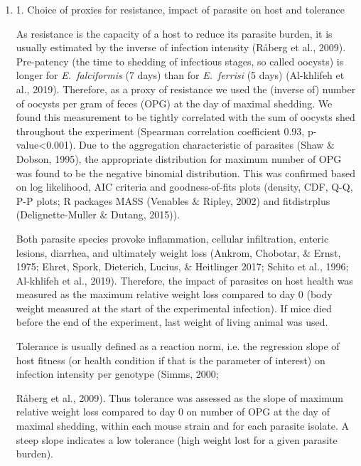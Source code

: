 \documentclass[12pt]{article}
\renewcommand{\_}{\kern-1.5pt\textunderscore\kern-1.5pt}
\begin{document}
\begin{enumerate}
	\item \textcolor[HTML]{CE181E}{1. Choice of proxies} \textcolor[HTML]{CE181E}{for }resistance, impact of parasite on host and tolerance\par

As resistance is the capacity of a host to reduce its parasite burden, it is usually estimated by the inverse of infection intensity (Råberg et al., 2009). Pre-patency (the time to shedding of infectious stages, so called oocysts) is longer for \textit{E. falciformis} (7 days) than for \textit{E. ferrisi} (5 days) (Al-khlifeh et al., 2019). Therefore, as a proxy of resistance we used the (inverse of) number of oocysts per gram of feces (OPG) at the day of maximal shedding. We found this measurement to be tightly correlated with the sum of oocysts shed throughout the experiment (\textcolor[HTML]{FF0000}{Spearman correlation coefficient 0.93, p-value<0.001). Due to the aggregation characteristic of parasites (Shaw $\&$  Dobson, }1995\textcolor[HTML]{1C1D1E}{), the appropriate distribution for maximum number of OPG was found to be the negative binomial distribution. This was confirmed based on log likelihood, AIC criteria and goodness-of-fits plots (density, CDF, Q-Q, P-P plots; R packages MASS (Venables $\&$  Ripley, 2002) and fitdistrplus (Delignette-Muller $\&$  Dutang, 2015)). }\par

Both parasite species provoke inflammation, cellular infiltration, enteric lesions, diarrhea, and ultimately weight loss (Ankrom, Chobotar, $\&$  Ernst, 1975; Ehret, Spork, Dieterich, Lucius, $\&$  Heitlinger 2017; Schito et al., 1996; Al-khlifeh et al., 2019). Therefore, the impact of parasites on host health was measured as the maximum relative weight loss compared to day 0 (body weight measured at the start of the experimental infection)\textcolor[HTML]{CE181E}{. If mice died before the end of the experiment, last weight of living animal was used}\textcolor[HTML]{FF0000}{. }\par

Tolerance is usually defined as a reaction norm, i.e. the regression slope of host fitness \textcolor[HTML]{FF0000}{(or health condition if that is the parameter of interest) on infection intensity per genotype (Simms, 2000;}{\fontsize{10pt}{12.0pt}\selectfont \textcolor[HTML]{1C1D1E}{ Råberg et al., 2009). Thus tolerance was assessed as the slope of maximum relative weight loss compared to day 0 on number of OPG at the day of maximal shedding, within each mouse strain and for each parasite isolate. A steep slope indicates a low tolerance (high weight lost for a given parasite burden).}\par}\par


\end{enumerate}
\end{document}
